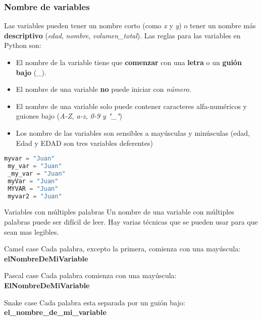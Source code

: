 \begin{frame}[fragile,b]
  \frametitle{Nombre de variables}

  \vspace{\baselineskip}
  Las variables pueden tener un nombre corto (como \textit{x} y \textit{y})
  o tener un nombre más \textbf{descriptivo} (\textit{edad}, \textit{nombre},
  \textit{volumen\_total}). Las reglas para las variables en Python son:
  \pausa

  \begin{itemize}
    \item El nombre de la variable tiene que \textbf{comenzar} con una
      \textbf{letra} o un \textbf{guión bajo} (\_).
    \pausa
    \item El nombre de una variable \textbf{no} puede iniciar con
      \textit{número.}
    \pausa
    \item El nombre de una variable solo puede contener caracteres
      alfa-numéricos y guiones bajo (\textit{A-Z, a-z, 0-9 y "\_"})
    \pausa
    \item Los nombre de las variables son sensibles a mayúsculas y minúsculas
      (edad, Edad y EDAD son tres variables deferentes)
  \end{itemize}
  \pausa

  \begin{lstlisting}[language=Python]
 myvar = "Juan"
 my_var = "Juan"
 _my_var = "Juan"
 myVar = "Juan"
 MYVAR = "Juan"
 myvar2 = "Juan"
  \end{lstlisting}
\end{frame}

\begin{frame}[c]{Variables con múltiples palabras}
  Un nombre de una variable con múltiples palabras puede ser difícil de leer.
  Hay varias técnicas que se pueden usar para que sean mas legibles.
  \pausa
  \begin{block}{Camel case}
    Cada palabra, excepto la primera, comienza con una mayúscula:
    \textbf{elNombreDeMiVariable}
  \end{block}
  \pausa
  \begin{block}{Pascal case}
    Cada palabra comienza con una mayúscula:
    \textbf{ElNombreDeMiVariable}
  \end{block}
  \pausa
  \begin{exampleblock}{Snake case}
    Cada palabra esta separada por un guión bajo:
    \textbf{el\_nombre\_de\_mi\_variable}
  \end{exampleblock}
\end{frame}

